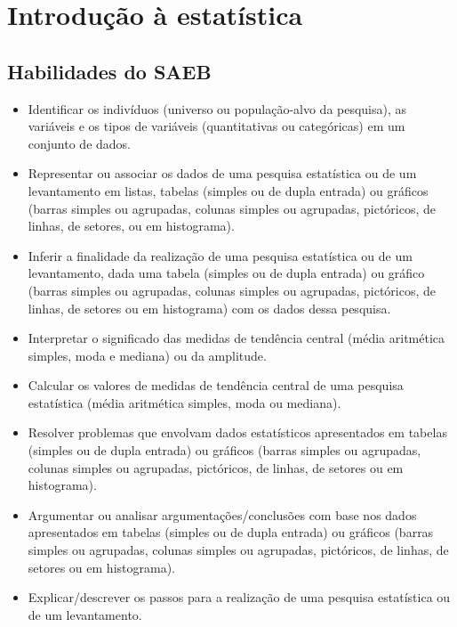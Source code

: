 

\chapter{Introdução à
estatística}

\section{Habilidades do SAEB}

\begin{itemize}
\item Identificar os indivíduos (universo ou
população-alvo da pesquisa), as variáveis e os tipos de variáveis
(quantitativas ou categóricas) em um conjunto de dados.
\item
  Representar ou associar os dados de uma pesquisa estatística ou de um
  levantamento em listas, tabelas (simples ou de dupla entrada) ou
  gráficos (barras simples ou agrupadas, colunas simples ou agrupadas,
  pictóricos, de linhas, de setores, ou em histograma).
\item
  Inferir a finalidade da realização de uma pesquisa estatística ou de
  um levantamento, dada uma tabela (simples ou de dupla entrada) ou
  gráfico (barras simples ou agrupadas, colunas simples ou agrupadas,
  pictóricos, de linhas, de setores ou em histograma) com os dados dessa
  pesquisa.
\item
  Interpretar o significado das medidas de tendência central (média
  aritmética simples, moda e mediana) ou da amplitude.
\item
  Calcular os valores de medidas de tendência central de uma pesquisa
  estatística (média aritmética simples, moda ou mediana).
\item
  Resolver problemas que envolvam dados estatísticos apresentados em
  tabelas (simples ou de dupla entrada) ou gráficos (barras simples ou
  agrupadas, colunas simples ou agrupadas, pictóricos, de linhas, de
  setores ou em histograma).
\item
  Argumentar ou analisar argumentações/conclusões com base nos dados
  apresentados em tabelas (simples ou de dupla entrada) ou gráficos
  (barras simples ou agrupadas, colunas simples ou agrupadas,
  pictóricos, de linhas, de setores ou em histograma).
\item
  Explicar/descrever os passos para a realização de uma pesquisa
  estatística ou de um levantamento.
\end{itemize}

